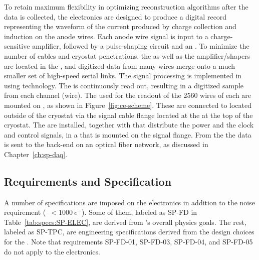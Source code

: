 To retain maximum flexibility in optimizing reconstruction algorithms after 
the  data is collected, the  electronics are designed 
to produce a digital record representing the waveform of the current produced 
by charge collection and induction on the anode wires. Each anode wire signal is 
input to a charge-sensitive amplifier, followed by a pulse-shaping circuit and 
an . To minimize the number of cables and cryostat penetrations, 
the  as well as the amplifier/shapers are located in the , 
and digitized data from many wires merge onto a much smaller set of high-speed 
serial links. The  signal processing is implemented in 
using  technology. The  is continuously read out, resulting 
in a digitized  sample from each  channel (wire). The 
 used for the readout of the \num{2560} wires of each  
are mounted on , as shown in Figure~\ref{fig:ce-scheme}. These are
connected to  located outside of the cryostat via the  signal 
cable flange located at the  \fdth at the top of the cryostat.
The  are installed, together with  that distribute
the power and the clock and control signals, in a  that is
mounted on the signal flange. From the  the data is sent to 
the  back-end on an optical fiber network, as discussed in 
Chapter~\ref{ch:sp-daq}. 

\subsection{Requirements and Specification}
\label{sec:fdsp-tpcelec-overview-requirements}

A number of specifications are imposed on the  electronics in addition to the 
noise requirement (~$<\SI{1000}{e^-}$). Some of them, labeled as 
SP-FD in Table~\ref{tab:specs:SP-ELEC}, are derived from 's 
overall physics goals. The rest, labeled as SP-TPC, are engineering specifications 
derived from the design choices for the . Note that requirements 
SP-FD-01, SP-FD-03, SP-FD-04, and SP-FD-05 do not apply to the  electronics. 


\pagebreak


